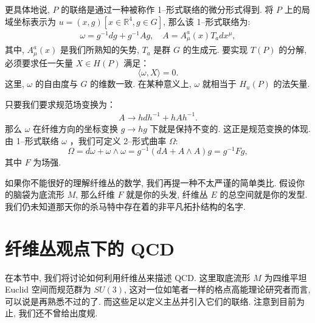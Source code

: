 \documentclass{article}
\begin{document}
\par 更具体地说, $P$ 的联络是通过一种被称作 1--形式联络的微分形式得到. 将 $P$ 上的局域坐标表示为 $u =(x, g)[x\in \mathbb{R}^{4}, g\in G]$, 那么该 1--形式联络为:
\begin{align}
\omega = g^{-1}dg+g^{-1}Ag,\quad A=A_{\mu}^{a}(x)T_{a}dx^{\mu},
\end{align}
其中, $A_{\mu}^{a}(x)$ 是我们所熟知的矢势, $T_{a}$ 是群 $G$ 的生成元. 要实现 $T(P)$ 的分解, 必须要求任一矢量 $X \in H(P)$ 满足：
\begin{equation}
\langle \omega, X\rangle=0.
\end{equation}
这里, $\omega$ 的自由度与 $G$ 的维数一致. 在某种意义上, $\omega$ 就相当于 $H_{u}(P)$ 的法矢量.

\par 只要我们要求规范场变换为：
\begin{align}
A \rightarrow hdh^{-1}+hAh^{-1}.
\end{align}
那么 $\omega$ 在纤维方向的坐标变换 $g \rightarrow hg$ 下就是保持不变的. 这正是规范变换的体现. 由 1--形式联络 $\omega$ ，我们可定义 2--形式曲率 $\Omega$:
\begin{equation}
\Omega=d\omega+\omega\wedge \omega=g^{-1}(dA+A\wedge A)g=g^{-1}Fg,
\end{equation}
其中 $F$ 为场强.

\par 如果你不能很好的理解纤维丛的数学, 我们再提一种不太严谨的简单类比. 假设你的脑袋为底流形 $M$, 那么纤维 $F$ 就是你的头发, 纤维丛 $E$ 的总空间就是你的发型. 我们仍未知道那天你的杀马特中存在着的非平凡拓扑结构的名字.
\section{纤维丛观点下的 QCD}
在本节中, 我们将讨论如何利用纤维丛来描述 QCD. 这里取底流形 $M$ 为四维平坦 Euclid 空间而规范群为 $SU(3)$, 这对一位如笔者一样的格点高能理论研究者而言, 可以说是再熟悉不过的了. 而这些足以定义主丛并引入它们的联络. 注意到目前为止, 我们还不曾给出度规.
\end{document}

